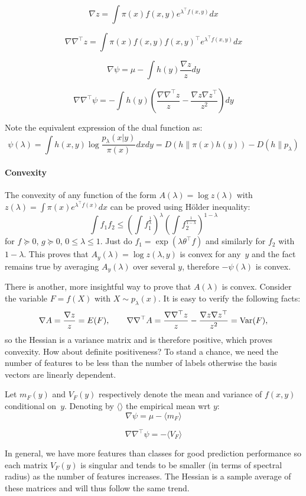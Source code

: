\documentclass[english]{scrartcl}
\begin{document}
$$
\nabla z
=
\int \pi(x) f(x,y)  e^{\lambda^\top f(x,y)} dx
$$

$$
\nabla \nabla^\top z 
=
\int \pi(x) f(x,y) f(x,y)^\top e^{\lambda^\top f(x,y)} dx
$$

$$
\nabla\psi
= \mu - \int h(y) \frac{\nabla z}{z} dy
$$

$$
\nabla\nabla^\top\psi
= - \int h(y) \left(
\frac{\nabla \nabla^\top z}{z} 
- \frac{\nabla z \nabla z^\top}{z^2}
\right)
dy
$$

Note the equivalent expression of the dual function as:
$$
\psi(\lambda)
=
\int h(x,y) \log \frac{p_\lambda(x|y)}{\pi(x)} dx dy
= D(h\|\pi(x)h(y)) - D(h\|p_\lambda)
$$


\paragraph{Convexity}

The convexity of any function of the form $A(\lambda)=\log z(\lambda)$ with $z(\lambda)=\int\pi(x)e^{\lambda^\top f(x)}dx$ can be proved using H\"older inequality:
$$
\int f_1 f_2 \leq 
\left(\int f_1^{\frac{1}{\lambda}} \right)^\lambda  
\left(\int f_2^{\frac{1}{1-\lambda}} \right)^{1-\lambda}  
$$
for $f\succeq 0$, $g\succeq 0$, $0\leq\lambda\leq 1$. Just do $f_1=\exp(\lambda\theta^\top f)$ and similarly for $f_2$ with $1-\lambda$. This proves that $A_y(\lambda) = \log z(\lambda,y)$ is convex for any~$y$  and the fact remains true by averaging $A_y(\lambda)$ over several $y$, therefore $-\psi(\lambda)$ is convex.

There is another, more insightful way to prove that $A(\lambda)$ is convex. Consider the variable $F=f(X)$ with $X\sim p_\lambda(x)$. It is easy to verify the following facts:
$$
\nabla A = \frac{\nabla z}{z} = E(F),
\qquad
\nabla\nabla^\top A 
= \frac{\nabla\nabla^\top z}{z} 
- \frac{\nabla z \nabla z^\top}{z^2}
= {\rm Var}(F),
$$
so the Hessian is a variance matrix and is therefore positive, which proves convexity. How about definite positiveness? To stand a chance, we need the number of features to be less than the number of labels otherwise the basis vectors are linearly dependent.

Let $m_F(y)$ and $V_F(y)$ respectively denote the mean and variance of $f(x,y)$ conditional on~$y$. Denoting by $\langle \rangle$ the empirical mean wrt $y$:
$$
\nabla \psi = \mu - \langle m_F \rangle
$$

$$
\nabla \nabla^\top \psi = - \langle V_F \rangle
$$

In general, we have more features than classes for good prediction performance so each matrix $V_F(y)$ is singular and tends to be smaller (in terms of spectral radius) as the number of features increases. The Hessian is a sample average of these matrices and will thus follow the same trend.
\end{document}
